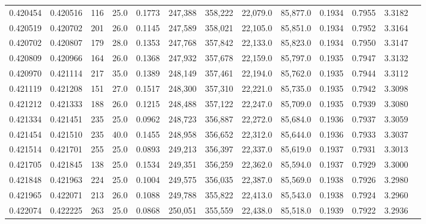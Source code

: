\begin{tabular}{rrrrrrrrrrrrr}
0.420454 & 0.420516 &   116 & 25.0 &                                     0.1773 & 247,388 & 358,222 &  22,079.0 &  85,877.0 & 0.1934 & 0.7955 & 3.3182 \\
0.420519 & 0.420702 &   201 & 26.0 &                                     0.1145 & 247,589 & 358,021 &  22,105.0 &  85,851.0 & 0.1934 & 0.7952 & 3.3164 \\
0.420702 & 0.420807 &   179 & 28.0 &                                     0.1353 & 247,768 & 357,842 &  22,133.0 &  85,823.0 & 0.1934 & 0.7950 & 3.3147 \\
0.420809 & 0.420966 &   164 & 26.0 &                                     0.1368 & 247,932 & 357,678 &  22,159.0 &  85,797.0 & 0.1935 & 0.7947 & 3.3132 \\
0.420970 & 0.421114 &   217 & 35.0 &                                     0.1389 & 248,149 & 357,461 &  22,194.0 &  85,762.0 & 0.1935 & 0.7944 & 3.3112 \\
0.421119 & 0.421208 &   151 & 27.0 &                                     0.1517 & 248,300 & 357,310 &  22,221.0 &  85,735.0 & 0.1935 & 0.7942 & 3.3098 \\
0.421212 & 0.421333 &   188 & 26.0 &                                     0.1215 & 248,488 & 357,122 &  22,247.0 &  85,709.0 & 0.1935 & 0.7939 & 3.3080 \\
0.421334 & 0.421451 &   235 & 25.0 &                                     0.0962 & 248,723 & 356,887 &  22,272.0 &  85,684.0 & 0.1936 & 0.7937 & 3.3059 \\
0.421454 & 0.421510 &   235 & 40.0 &                                     0.1455 & 248,958 & 356,652 &  22,312.0 &  85,644.0 & 0.1936 & 0.7933 & 3.3037 \\
0.421514 & 0.421701 &   255 & 25.0 &                                     0.0893 & 249,213 & 356,397 &  22,337.0 &  85,619.0 & 0.1937 & 0.7931 & 3.3013 \\
0.421705 & 0.421845 &   138 & 25.0 &                                     0.1534 & 249,351 & 356,259 &  22,362.0 &  85,594.0 & 0.1937 & 0.7929 & 3.3000 \\
0.421848 & 0.421963 &   224 & 25.0 &                                     0.1004 & 249,575 & 356,035 &  22,387.0 &  85,569.0 & 0.1938 & 0.7926 & 3.2980 \\
0.421965 & 0.422071 &   213 & 26.0 &                                     0.1088 & 249,788 & 355,822 &  22,413.0 &  85,543.0 & 0.1938 & 0.7924 & 3.2960 \\
0.422074 & 0.422225 &   263 & 25.0 &                                     0.0868 & 250,051 & 355,559 &  22,438.0 &  85,518.0 & 0.1939 & 0.7922 & 3.2936 \\

\end{tabular}
